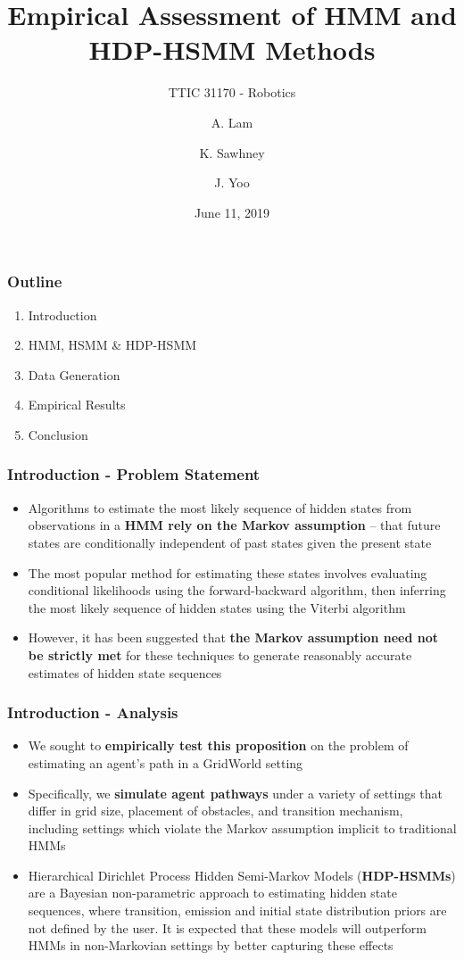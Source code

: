 \documentclass{beamer}
\title[]{Empirical Assessment of HMM and HDP-HSMM Methods}
\subtitle{TTIC 31170 - Robotics}
\author[Lam, Sawhney, Yoo]{A. Lam \and K. Sawhney \and J. Yoo}
\date[June 11, 2019]{June 11, 2019}
\begin{document}
\frame{\titlepage}

\begin{frame}
\frametitle{Outline}
    \begin{enumerate}[I]
        \item Introduction
        \item HMM, HSMM \& HDP-HSMM
        \item Data Generation
        \item Empirical Results
        \item Conclusion
    \end{enumerate}
\end{frame}


\begin{frame}
\frametitle{Introduction - Problem Statement}
    \begin{itemize}
        \item Algorithms to estimate the most likely sequence of hidden states from observations in a \textbf{HMM rely on the Markov assumption} -- that future states are conditionally independent of past states given the present state
        \item The most popular method for estimating these states involves evaluating conditional likelihoods using the forward-backward algorithm, then inferring the most likely sequence of hidden states using the Viterbi algorithm
        \item However, it has been suggested that \textbf{the Markov assumption need not be strictly met} for these techniques to generate reasonably accurate estimates of hidden state sequences
    \end{itemize}
\end{frame}

\begin{frame}
    \frametitle{Introduction - Analysis}
        \begin{itemize}
            \item We sought to \textbf{empirically test this proposition} on the problem of estimating an agent's path in a GridWorld setting
            \item Specifically, we \textbf{simulate agent pathways} under a variety of settings that differ in grid size, placement of obstacles, and transition mechanism, including settings which violate the Markov assumption implicit to traditional HMMs
            \item Hierarchical Dirichlet Process Hidden Semi-Markov Models (\textbf{HDP-HSMMs}) are a Bayesian non-parametric approach to estimating hidden state sequences, where transition, emission and initial state distribution priors are not defined by the user. It is expected that these models will outperform HMMs in non-Markovian settings by better capturing these effects
        \end{itemize}
    \end{frame}
\end{document}
